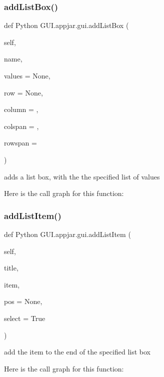 \subsubsection{\texorpdfstring{add\+List\+Box()}{addListBox()}}
{\footnotesize\ttfamily def Python G\+U\+I.\+appjar.\+gui.\+add\+List\+Box (\begin{DoxyParamCaption}\item[{}]{self,  }\item[{}]{name,  }\item[{}]{values = {\ttfamily None},  }\item[{}]{row = {\ttfamily None},  }\item[{}]{column = {},  }\item[{}]{colspan = {},  }\item[{}]{rowspan = {} }\end{DoxyParamCaption})}

\begin{DoxyVerb}adds a list box, with the the specified list of values \end{DoxyVerb}
 Here is the call graph for this function\+:
\mbox{\label{class_python_01_g_u_i_1_1appjar_1_1gui_a4aed1f8de7d6ecf1c0e90842e06f6db2}} 
\subsubsection{\texorpdfstring{add\+List\+Item()}{addListItem()}}
{\footnotesize\ttfamily def Python G\+U\+I.\+appjar.\+gui.\+add\+List\+Item (\begin{DoxyParamCaption}\item[{}]{self,  }\item[{}]{title,  }\item[{}]{item,  }\item[{}]{pos = {\ttfamily None},  }\item[{}]{select = {\ttfamily True} }\end{DoxyParamCaption})}

\begin{DoxyVerb}add the item to the end of the specified list box \end{DoxyVerb}
 Here is the call graph for this function\+:
\mbox{\label{class_python_01_g_u_i_1_1appjar_1_1gui_a228d62f783bb8686809dfbe6e7280946}} 
